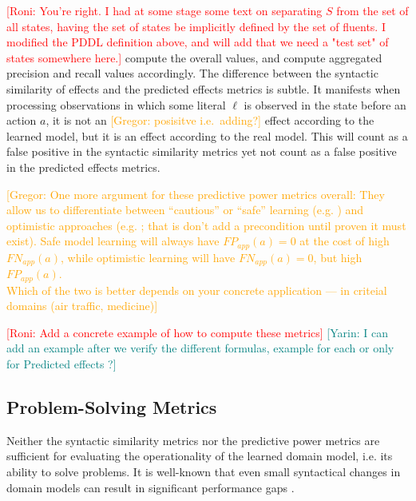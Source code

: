 \documentclass{article}
\theoremstyle{definition}
\theoremstyle{remark}
\newcommand{\roni}[1]{{\textcolor{red}{[Roni: #1]}}}
\newcommand{\mauro}[1]{{\textcolor{green}{[Mauro: #1]}}}
\newcommand{\yarin}[1]{{\textcolor{teal}{[Yarin: #1]}}}
\newcommand{\gregor}[1]{{\textcolor{orange}{[Gregor: #1]}}}
\begin{document}
\roni{You're right. I had at some stage some text on separating $S$ from the set of all states, having the set of states be implicitly defined by the set of fluents. I modified the PDDL definition above, and will add that we need a "test set" of states somewhere here.}
compute the overall values, and compute aggregated precision and recall values accordingly.  
The difference between the syntactic similarity of effects and the predicted effects metrics is subtle. 
It manifests when processing observations in which some literal $\ell$ is observed in the state before an action $a$, 
it is not an \gregor{posisitve i.e.\ adding?} effect according to the learned model, but it is an effect according to the real model. 
This will count as a false positive in the syntactic similarity metrics yet not count as a false positive in the predicted effects metrics. 


\gregor{One more argument for these predictive power metrics overall: They allow us to differentiate between ``cautious'' or ``safe'' learning (e.g. \cite{juba2021safe}) and optimistic approaches (e.g. \cite{Bachor24learning}; that is don't add a precondition until proven it must exist). Safe model learning will always have $FP_{app}(a) = 0$ at the cost of high $FN_{app}(a)$, while optimistic learning will have $FN_{app}(a) = 0$, but high $FP_{app}(a)$.\\
Which of the two is better depends on your concrete application --- in criteial domains (air traffic, medicine)}

\roni{Add a concrete example of how to compute these metrics}
\yarin{I can add an example after we verify the different formulas, example for each or only for Predicted effects ?}

 
\subsection{Problem-Solving Metrics}
Neither the syntactic similarity metrics nor the predictive power metrics are sufficient for evaluating the operationality \citep{DBLP:conf/kcap/McCluskeyVV17} of the learned domain model, i.e. its ability to solve problems. It is well-known that even small syntactical changes in domain models can result in significant performance gaps \citep{DBLP:conf/kcap/VallatiC19,vallati2021importance}.
\end{document}
